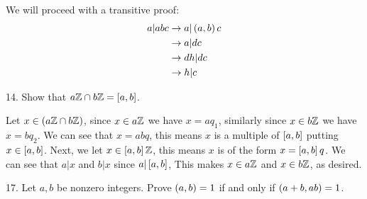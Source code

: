 \begin{mdframed}[style=darkAnswer,frametitle={Joe Starr}]
We will proceed with a transitive proof:
\begin{align*}
    a\vert abc &\rightarrow a\vert \left(a,b\right)c \\
    &\rightarrow a\vert dc\\
    &\rightarrow dh\vert dc\\
    &\rightarrow h\vert c
\end{align*}
\end{mdframed}
\newpage
\begin{mdframed}[style=darkQuesion]
14. Show that $a\mathbb{Z} \cap b\mathbb{Z}=\left[a,b\right]$.
\end{mdframed}

\begin{mdframed}[style=darkAnswer,frametitle={Joe Starr}]
    Let $x\in \left(a\mathbb{Z} \cap b\mathbb{Z}\right)$, since $x\in a\mathbb{Z}$ we have $x=aq_1$, similarly 
    since $x\in b\mathbb{Z}$ we have$x=bq_2$. We can see that $x=abq$, this means $x$ 
    is a multiple of $\left[a,b\right]$ putting $x\in \left[a,b\right]$. Next, we let 
    $x\in \left[a,b\right]\mathbb{Z}$, this means $x$ is of the form $x=\left[a,b\right]q$. We can see
    that $a\vert x$ and $b\vert x$ since $a\vert \left[a,b\right]$, This makes 
    $x\in a\mathbb{Z}$ and $x\in b\mathbb{Z}$, as desired. 
\end{mdframed}
\newpage
\begin{mdframed}[style=darkQuesion]
17. Let $a,b$ be nonzero integers. Prove $\left(a,b\right)=1$ if and only if 
$\left(a+b,ab\right)=1$. 
\end{mdframed}

